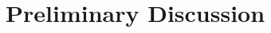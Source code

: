 \documentclass[aps,prb,twocolumn,letterpaper,twoside,nobalancelastpage,groupedaddress,amsmath,amssymb,floatfix,citeautoscript]{revtex4-1}
\begin{document}



\section{Preliminary Discussion}
\end{document}
